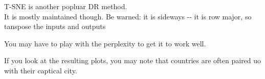 \documentclass[11pt]{article}
\begin{document}
T-SNE is another popluar DR method.\\
It is mostly maintained though. Be warned: it is sideways -\/- it is row
major, so tanspose the inputs and outputs

You may have to play with the perplexity to get it to work well.

If you look at the resulting plots, you may note that countries are
often paired uo with their captical city.


    
    
    
    
\end{document}
